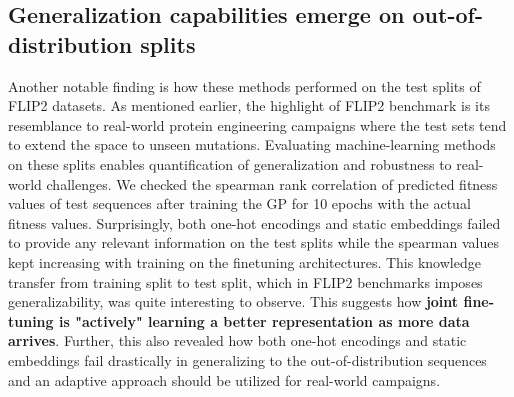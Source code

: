 \documentclass{article}
\theoremstyle{plain}
\theoremstyle{definition}
\theoremstyle{remark}
\begin{document}
\subsection{Generalization capabilities emerge on out-of-distribution splits}
Another notable finding is how these methods performed on the test splits of FLIP2 datasets. As mentioned earlier, the highlight of FLIP2 benchmark is its resemblance to real-world protein engineering campaigns where the test sets tend to extend the space to unseen mutations. Evaluating machine-learning methods on these splits enables quantification of generalization and robustness to real-world challenges. We checked the spearman rank correlation of predicted fitness values of test sequences after training the GP for 10 epochs with the actual fitness values. Surprisingly, both one-hot encodings and static embeddings failed to provide any relevant information on the test splits while the spearman values kept increasing with training on the finetuning architectures. This knowledge transfer from training split to test split, which in FLIP2 benchmarks imposes generalizability, was quite interesting to observe. This suggests how \textbf{joint fine-tuning is "actively" learning a better representation as more data arrives}. Further, this also revealed how both one-hot encodings and static embeddings fail drastically in generalizing to the out-of-distribution sequences and an adaptive approach should be utilized for real-world campaigns.
\end{document}
